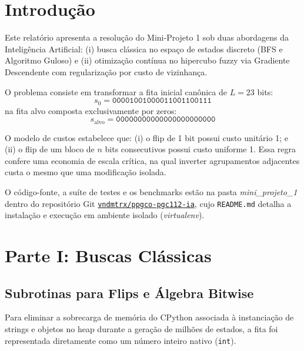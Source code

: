 \documentclass[
	12pt,
	a4paper,
	article,
	twocolumn,
	brazil
]{abntex2}
\begin{document}
\frenchspacing
\SingleSpacing

\maketitle

\section{Introdução}

Este relatório apresenta a resolução do Mini-Projeto 1 sob duas abordagens da Inteligência Artificial: (i) busca clássica no espaço de estados discreto (BFS e Algoritmo Guloso) e (ii) otimização contínua no hipercubo fuzzy via Gradiente Descendente com regularização por custo de vizinhança.

O problema consiste em transformar a fita inicial canônica de $L = 23$ bits:
\begin{equation}
s_0 = \texttt{00001001000011001100111}
\end{equation}
na fita alvo composta exclusivamente por zeros:
\begin{equation}
s_{\text{alvo}} = \texttt{00000000000000000000000}
\end{equation}

O modelo de custos estabelece que: (i) o flip de 1 bit possui custo unitário 1; e (ii) o flip de um bloco de $n$ bits consecutivos possui custo uniforme 1. Essa regra confere uma economia de escala crítica, na qual inverter agrupamentos adjacentes custa o mesmo que uma modificação isolada.

O código-fonte, a suíte de testes e os benchmarks estão na pasta \textit{mini\_projeto\_1} dentro do repositório Git \href{https://github.com/vndmtrx/ppgco-pgc112-ia}{\texttt{vndmtrx/ppgco-pgc112-ia}}, cujo \texttt{README.md} detalha a instalação e execução em ambiente isolado (\textit{virtualenv}).

\section{Parte I: Buscas Clássicas}

\subsection{Subrotinas para Flips e Álgebra Bitwise}

Para eliminar a sobrecarga de memória do CPython associada à instanciação de strings e objetos no heap durante a geração de milhões de estados, a fita foi representada diretamente como um número inteiro nativo (\texttt{int}). 
\end{document}

